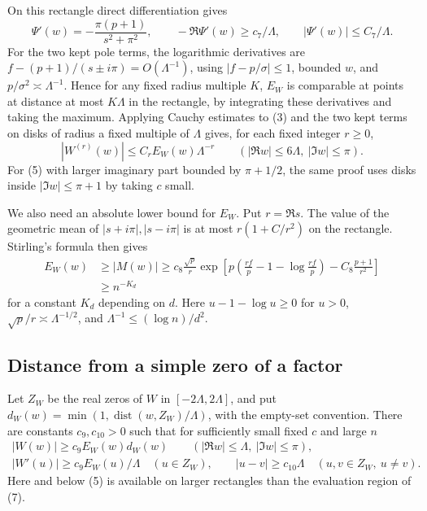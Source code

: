 \documentclass[11pt]{article}
\begin{document}
On this rectangle direct differentiation gives
\[
 \Psi'(w)=-\frac{\pi(p+1)}{s^2+\pi^2},\qquad
 -\Re\Psi'(w)\ge c_7/\Lambda,\qquad
 |\Psi'(w)|\le C_7/\Lambda .
 \tag{4}
\]
For the two kept pole terms, the logarithmic derivatives are $f-(p+1)/(s\pm i\pi)=O(\Lambda^{-1})$, using $|f-p/\sigma|\le1$, bounded $w$, and $p/\sigma^2\asymp\Lambda^{-1}$. Hence for any fixed radius multiple $K$, $E_W$ is comparable at points at distance at most $K\Lambda$ in the rectangle, by integrating these derivatives and taking the maximum. Applying Cauchy estimates to (3) and the two kept terms on disks of radius a fixed multiple of $\Lambda$ gives, for each fixed integer $r\ge0$,
\[
 |W^{(r)}(w)|\le C_r E_W(w)\Lambda^{-r}
 \qquad (|\Re w|\le6\Lambda,\ |\Im w|\le\pi).
 \tag{5}
\]
For (5) with larger imaginary part bounded by $\pi+1/2$, the same proof uses disks inside $|\Im w|\le\pi+1$ by taking $c$ small.

We also need an absolute lower bound for $E_W$. Put $r=\Re s$. The value of the geometric mean of $|s+i\pi|,|s-i\pi|$ is at most $r(1+C/r^2)$ on the rectangle. Stirling's formula then gives
\[
 \begin{aligned}
 E_W(w)&\ge |M(w)|
 \ge c_8\frac{\sqrt p}{r}
   \exp\left[p\left(\frac{rf}{p}-1-\log\frac{rf}{p}\right)
                 -C_8\frac{p+1}{r^2}\right]\\
 &\ge n^{-K_d}
 \end{aligned}
 \tag{6}
\]
for a constant $K_d$ depending on $d$. Here $u-1-\log u\ge0$ for $u>0$, $\sqrt p/r\asymp \Lambda^{-1/2}$, and $\Lambda^{-1}\le(\log n)/d^2$.

\subsection{Distance from a simple zero of a factor}

Let $Z_W$ be the real zeros of $W$ in $[-2\Lambda,2\Lambda]$, and put $d_W(w)=\min(1,\operatorname{dist}(w,Z_W)/\Lambda)$, with the empty-set convention. There are constants $c_9,c_{10}>0$ such that for sufficiently small fixed $c$ and large $n$
\[
 \begin{gathered}
 |W(w)|\ge c_9 E_W(w)d_W(w)
 \qquad (|\Re w|\le\Lambda,\ |\Im w|\le\pi),\\
 |W'(u)|\ge c_9 E_W(u)/\Lambda\quad(u\in Z_W),\qquad
 |u-v|\ge c_{10}\Lambda\quad(u,v\in Z_W,\ u\ne v).
 \tag{7}
 \end{gathered}
\]
Here and below (5) is available on larger rectangles than the evaluation region of (7).
\end{document}
